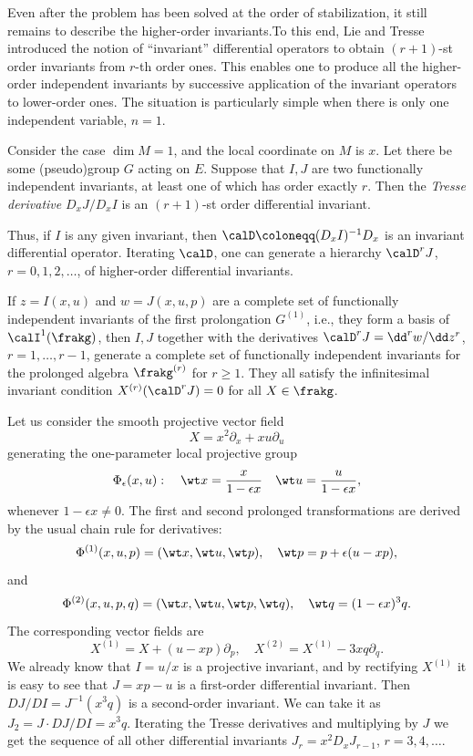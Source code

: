 Even after the problem has been solved at the order of stabilization, it still remains to describe the higher-order invariants.To this end, Lie and Tresse introduced the notion of ``invariant'' differential operators to obtain $(r+1)$-st order invariants from $r$-th order ones. This enables one to produce all the higher-order independent invariants by successive application of the invariant operators to lower-order ones. The situation is particularly simple when there is only one independent variable, $n=1$.

\begin{thm}
    Consider the case $\dim M=1$, and the local coordinate on $M$ is $x$. Let there be some (pseudo)group $G$ acting on $E$. Suppose that $I,J$ are two functionally independent invariants, at least one of which has order exactly $r$. Then the \emph{Tresse derivative} $D_x J/D_x I$   is an $(r+1)$-st order differential invariant.
\end{thm}

Thus, if $I$ is any given invariant, then $\calD\coloneqq (D_x I)^{-1}D_x$ is an invariant differential operator. Iterating $\calD$, one can generate a hierarchy $\calD^r J$, $r=0,1,2,\ldots$, of higher-order differential invariants.

If $z=I(x,u)$ and $w=J(x,u,p)$ are a complete set of functionally independent invariants of the first prolongation $G^{(1)}$, i.e., they form a basis of $\calI^1(\frakg)$, then $I,J$ together with the derivatives $\calD^r J=\dd ^rw/\dd z^r$, $r=1,\ldots,r-1$, generate a complete set of functionally independent invariants for the prolonged algebra $\frakg^{(r)}$ for $r\geq 1$. They all satisfy the infinitesimal invariant condition $X^{(r)}(\calD^r J)=0$ for all $X\in\frakg$.

\begin{example}
    Let us consider the smooth projective vector field 
    \[X=x^2\partial_x+xu\partial_u\]
    generating the one-parameter local projective group 
    \[\Phi_\epsilon(x,u):\quad \wt x=\frac{x}{1-\epsilon x}\quad \wt u=\frac{u}{1-\epsilon x},\]
    whenever $1-\epsilon x\neq 0$. The first and second prolonged transformations are derived by the usual chain rule for derivatives:
    \[\Phi^{(1)}(x,u,p)=(\wt x,\wt u,\wt p),\quad \wt p=p+\epsilon(u-xp),\]
    and 
    \[\Phi^{(2)}(x,u,p,q)=(\wt x,\wt u,\wt p,\wt q),\quad \wt q=(1-\epsilon x)^3 q.\]
    The corresponding vector fields are 
    \[X^{(1)}=X+(u-xp)\partial_p,\quad X^{(2)}=X^{(1)}-3xq\partial_q.\]
    We already know that $I=u/x$ is a projective invariant, and by rectifying $X^{(1)}$ it is easy to see that $J=xp-u$ is a first-order differential invariant. Then $DJ/DI=J^{-1}(x^3q)$ is a second-order invariant. We can take it as $J_2=J\cdot DJ/DI=x^3 q$. Iterating the Tresse derivatives and multiplying by $J$ we get the sequence of all other differential invariants $J_r=x^2 D_x J_{r-1}$, $r=3,4,\ldots$.
\end{example}


